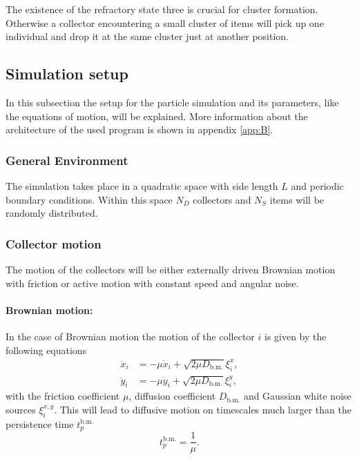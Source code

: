 The existence of the refractory state three is crucial for cluster formation. Otherwise a collector encountering a small cluster of items will pick up one individual and drop it at the same cluster just at another position.

\subsection{Simulation setup}\label{sec:simset}

In this subsection the setup for the particle simulation and its parameters, like the equations of motion,  will be explained. More information about the architecture of the used program is shown in appendix \ref{app:B}.

\subsubsection{General Environment}

The simulation takes place in a quadratic space with side length $L$ and periodic boundary conditions. Within this space $N_D$ collectors and $N_S$ items will be randomly distributed.

\subsubsection{Collector motion}

The motion of the collectors will be either externally driven Brownian motion with friction or active motion with constant speed and angular noise.

\paragraph{Brownian motion:}

In the case of Brownian motion the motion of the collector $i$ is given by the following equations
%
\begin{align}
 \nonumber \ddot{x}_i &= -\mu\dot x_i+\sqrt{2\mu D_{\text{b.m.}}}\xi_i^x,\\
 \ddot{y}_i &= -\mu\dot y_i+\sqrt{2\mu D_{\text{b.m.}}}\xi_i^y,
\label{eq:DGLbrm_simset}
\end{align}
with the friction coefficient $\mu$, diffusion coefficient $D_{\text{b.m.}}$ and Gaussian white noise sources $\xi_i^{x,y}$. This will lead to diffusive motion on timescales much larger than the persistence time $t_p^{\text{b.m.}}$
%
\begin{equation}
	t_p^{\text{b.m.}} = \frac{1}{\mu}.
\label{eq:perstimeBM_simset}
\end{equation}

